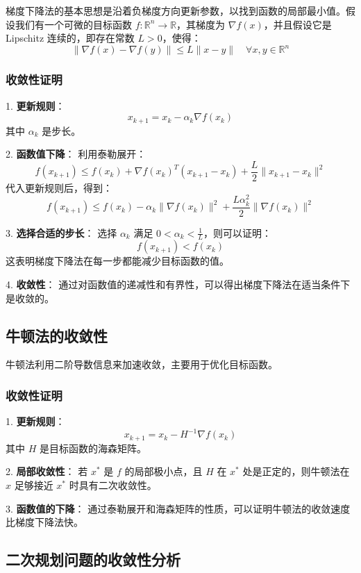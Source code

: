 \documentclass[a4paper]{article}
\begin{document}
梯度下降法的基本思想是沿着负梯度方向更新参数，以找到函数的局部最小值。假设我们有一个可微的目标函数 $f: \mathbb{R}^n \to \mathbb{R}$，其梯度为 $\nabla f(x)$，并且假设它是 Lipschitz 连续的，即存在常数 $L > 0$，使得：
\[
\|\nabla f(x) - \nabla f(y)\| \leq L \|x - y\| \quad \forall x, y \in \mathbb{R}^n
\]

\subsubsection{收敛性证明}

1. \textbf{更新规则}：
   \[
   x_{k+1} = x_k - \alpha_k \nabla f(x_k)
   \]
   其中 $\alpha_k$ 是步长。

2. \textbf{函数值下降}：
   利用泰勒展开：
   \[
   f(x_{k+1}) \leq f(x_k) + \nabla f(x_k)^T (x_{k+1} - x_k) + \frac{L}{2} \|x_{k+1} - x_k\|^2
   \]
   代入更新规则后，得到：
   \[
   f(x_{k+1}) \leq f(x_k) - \alpha_k \|\nabla f(x_k)\|^2 + \frac{L \alpha_k^2}{2} \|\nabla f(x_k)\|^2
   \]

3. \textbf{选择合适的步长}：
   选择 $\alpha_k$ 满足 $0 < \alpha_k < \frac{1}{L}$，则可以证明：
   \[
   f(x_{k+1}) < f(x_k)
   \]
   这表明梯度下降法在每一步都能减少目标函数的值。

4. \textbf{收敛性}：
   通过对函数值的递减性和有界性，可以得出梯度下降法在适当条件下是收敛的。

\subsection{牛顿法的收敛性}

牛顿法利用二阶导数信息来加速收敛，主要用于优化目标函数。

\subsubsection{收敛性证明}

1. \textbf{更新规则}：
   \[
   x_{k+1} = x_k - H^{-1} \nabla f(x_k)
   \]
   其中 $H$ 是目标函数的海森矩阵。

2. \textbf{局部收敛性}：
   若 $x^*$ 是 $f$ 的局部极小点，且 $H$ 在 $x^*$ 处是正定的，则牛顿法在 $x$ 足够接近 $x^*$ 时具有二次收敛性。

3. \textbf{函数值的下降}：
   通过泰勒展开和海森矩阵的性质，可以证明牛顿法的收敛速度比梯度下降法快。

\subsection{二次规划问题的收敛性分析}
\end{document}
